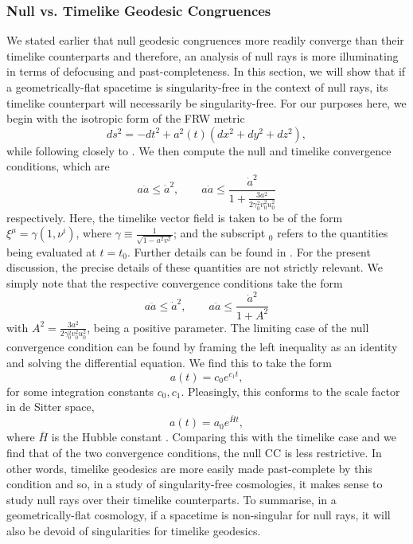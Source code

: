 \subsubsection*{Null vs. Timelike Geodesic Congruences}
We stated earlier that null geodesic congruences more readily converge than their timelike counterparts and therefore, an analysis of null rays is more illuminating in terms of defocusing and past-completeness. In this section, we will show that if a geometrically-flat spacetime is singularity-free in the context of null rays, its timelike counterpart will necessarily be singularity-free. For our purposes here, we begin with the isotropic form of the FRW metric
 \[
 ds^2=-dt^2+a^2(t)(dx^2+dy^2+dz^2)
, \]
while following closely to \cite{Albareti:2014dxa}. We then compute the null and timelike convergence conditions, which are
\[
a\ddot{a}\leq\dot{a}^{2},\qquad a\ddot{a}\leq\frac{\dot{a}^{2}}{1+\frac{3a^{2}}{2\gamma_{0}^{2}v_{0}^{2}u_{0}^{2}}}
 \]
 respectively. Here, the timelike vector field is taken to be of the form $\xi^\mu=\gamma(1,\nu^i)$, where $\gamma\equiv \frac{1}{\sqrt{1-a^2 v^2}}$; and the subscript $_0$ refers to the quantities being evaluated at $t=t_0$. Further details can be found in \cite{Albareti:2014dxa}. For the present discussion, the precise details of these quantities are not strictly relevant. We simply note that the respective convergence conditions take the form
 \[
 a\ddot{a}\leq\dot{a}^{2},\qquad a\ddot{a}\leq\frac{\dot{a}^2}{1+A^2}
\]
with $A^{2}=\frac{3a^{2}}{2\gamma_{0}^{2}v_{0}^{2}u_{0}^{2}}$, being a positive parameter. The limiting case of the null convergence condition can be found by framing the left inequality as an identity and solving the differential equation. We find this to take the form 
\[
a(t)=c_0 e^{c_1 t},
\]
for some integration constants $c_0,c_1$. Pleasingly, this conforms to the scale factor in de Sitter space,
\[
a(t)=a_0 e^{\bar{H} t}
,\]
where ${\bar H}$ is the Hubble constant \cite{Albareti:2014dxa}. Comparing this with the timelike case and we find that of the two convergence conditions, the null CC is less restrictive. In other words, timelike geodesics are more easily made past-complete by this condition and so, in a study of singularity-free cosmologies, it makes sense to study null rays over their timelike counterparts. To summarise, in a geometrically-flat cosmology, if a spacetime is non-singular for null rays, it will also be devoid of singularities for timelike geodesics.
